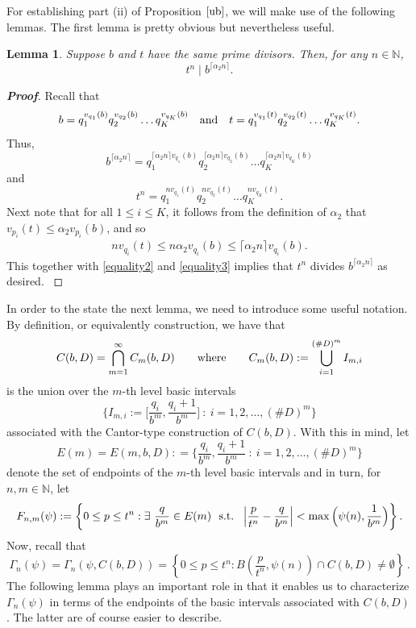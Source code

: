 \documentclass[12pt]{article}
\newtheorem{lemma}{Lemma}[section]
\theoremstyle{definition}
\theoremstyle{remark}
\begin{document}
For establishing part (ii) of Proposition $\ref{ub}$, we will make use of  the following lemmas. The first lemma is pretty obvious  but nevertheless useful. 
\begin{lemma}\label{divisible 5}  
Suppose $b$ and $t$ have the same prime divisors.  Then,  
for any $n\in\mathbb{N}$,
$$t^{n}\mid b^{\lceil \alpha_{2}n\rceil}.$$
\end{lemma}
\begin{proof}[\rm \textbf{Proof}]
Recall that
$$b=q_{1}^{v_{q_{1}}(b)}q_{2}^{v_{q_{2}}(b)}\ldots q_{K}^{v_{q_{K}}(b)}  \quad 
{\rm and  }  \quad  t=q_{1}^{v_{q_{1}}(t)}q_{2}^{v_{q_{2}}(t)}\ldots q_{K}^{v_{q_{K}}(t)}.$$
Thus,
\begin{equation}\label{equality2}
b^{\lceil \alpha_{2}n\rceil}=q_{1}^{\lceil \alpha_{2}n\rceil v_{q_{1}}(b)}q_{2}^{\lceil \alpha_{2}n\rceil v_{q_{2}}(b)}\ldots q_{K}^{\lceil \alpha_{2}n\rceil v_{q_{K}}(b)}
\end{equation}
and
\begin{equation}\label{equality3}
t^{n}=q_{1}^{nv_{q_{1}}(t)}q_{2}^{nv_{q_{2}}(t)}\ldots q_{K}^{nv_{q_{K}}(t)}.
\end{equation}
Next note that for all $1\leq i\leq K$, it follows from the definition of $\alpha_{2}$ that $v_{p_{i}}(t)\leq\alpha_{2}v_{p_{i}}(b)$, and so
\begin{equation*}
\begin{aligned}
nv_{q_{i}}(t)\leq n\alpha_{2}v_{q_{i}}(b)\leq\lceil \alpha_{2}n\rceil v_{q_{i}}(b).
\end{aligned}
\end{equation*}
This together with \eqref{equality2} and \eqref{equality3} implies that  $
t^{n}$ divides $ b^{\lceil \alpha_{2}n\rceil}
  $ as desired. 
\textrm{}
\end{proof}

In order to the state the next lemma, we  need to introduce  some useful notation.  By definition, or equivalently construction,  we have that 
$$C(b,D)
=\bigcap_{m=1}^{\infty}C_{m}(b,D)   \qquad {\rm where }  \qquad C_{m}(b,D) :=   \bigcup_{i=1}^{(\#D)^{m}}I_{m,i} $$
is the union over the $m$-th level basic intervals
$$\Big\{I_{m,i}:= \Big[\textstyle{\frac{q_{i}}{b^{m}},\frac{q_{i}+1}{b^{m}}}\Big]
\ : \ i=1,2,\ldots,(\#D)^{m}\Big\}$$ 
associated with the  Cantor-type construction of $C(b, D)$.  With this in mind, let 
 $$E(m)=E(m,b,D): = \Big\{ \frac{q_{i}}{b^{m}},\frac{q_{i}+1}{b^{m}} 
\ : \ i=1,2,\ldots,(\#D)^{m}\Big\}$$ 
 denote the set of endpoints of the $m$-th level basic intervals  and in turn, for  $n,m\in\mathbb{N}$, let
$$F_{n,m}(\psi):=\left\{0\leq p\leq t^{n}: \exists\ \frac{q}{b^{m}}\in E(m)   \ \ {\rm s.t.}\ \ \left|\frac{p}{t^{n}}-\frac{q}{b^{m}}\right|<\max\Big(\psi(n),\frac{1}{b^{m}}\Big)\right\}.$$
Now, recall that  
$$
\Gamma_n (\psi) = \Gamma_{n}(\psi,C(b,D))= \left\{0\le p\le t^{n}:  \textstyle{B\left(\frac{p}{t^{n}},\psi(n)\right)}\cap  C(b,D)\neq\emptyset\right\}  \,  . $$
The following lemma plays an important role in that it enables us to  characterize $ \Gamma_n (\psi) $
in terms of the endpoints of the basic intervals  associated with $C(b, D)$. The latter are of course easier to describe. 
\end{document}
